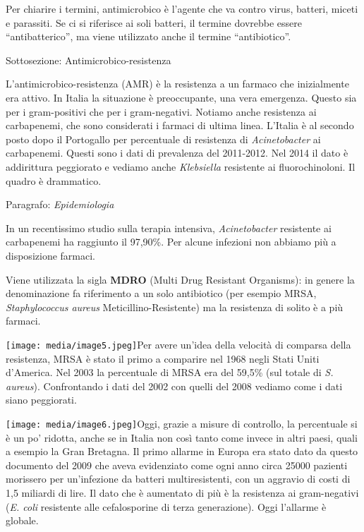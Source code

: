 \documentclass[]{article}
\begin{document}
Per chiarire i termini, antimicrobico è l'agente che va contro virus,
batteri, miceti e parassiti. Se ci si riferisce ai soli batteri, il
termine dovrebbe essere ``antibatterico'', ma viene utilizzato anche il
termine ``antibiotico''.

Sottosezione: Antimicrobico-resistenza

L'antimicrobico-resistenza (AMR) è la resistenza a un farmaco che
inizialmente era attivo. In Italia la situazione è preoccupante, una
vera emergenza. Questo sia per i gram-positivi che per i gram-negativi.
Notiamo anche resistenza ai carbapenemi, che sono considerati i farmaci
di ultima linea. L'Italia è al secondo posto dopo il Portogallo per
percentuale di resistenza di \emph{Acinetobacter} ai carbapenemi. Questi
sono i dati di prevalenza del 2011-2012. Nel 2014 il dato è addirittura
peggiorato e vediamo anche \emph{Klebsiella} resistente ai
fluorochinoloni. Il quadro è drammatico.

Paragrafo: \emph{Epidemiologia}

In un recentissimo studio sulla terapia intensiva, \emph{Acinetobacter}
resistente ai carbapenemi ha raggiunto il 97,90\%. Per alcune infezioni
non abbiamo più a disposizione farmaci.

Viene utilizzata la sigla \textbf{MDRO} (Multi Drug Resistant
Organisms): in genere la denominazione fa riferimento a un solo
antibiotico (per esempio MRSA, \emph{Staphylococcus aureus}
Meticillino-Resistente) ma la resistenza di solito è a più farmaci.

\texttt{[image: media/image5.jpeg]}Per
avere un'idea della velocità di comparsa della resistenza, MRSA è stato
il primo a comparire nel 1968 negli Stati Uniti d'America. Nel 2003 la
percentuale di MRSA era del 59,5\% (sul totale di \emph{S. aureus}).
Confrontando i dati del 2002 con quelli del 2008 vediamo come i dati
siano peggiorati.

\texttt{[image: media/image6.jpeg]}Oggi,
grazie a misure di controllo, la percentuale si è un po' ridotta, anche
se in Italia non così tanto come invece in altri paesi, quali a esempio
la Gran Bretagna. Il primo allarme in Europa era stato dato da questo
documento del 2009 che aveva evidenziato come ogni anno circa 25000
pazienti morissero per un'infezione da batteri multiresistenti, con un
aggravio di costi di 1,5 miliardi di lire. Il dato che è aumentato di
più è la resistenza ai gram-negativi (\emph{E. coli} resistente alle
cefalosporine di terza generazione). Oggi l'allarme è globale.
\end{document}
